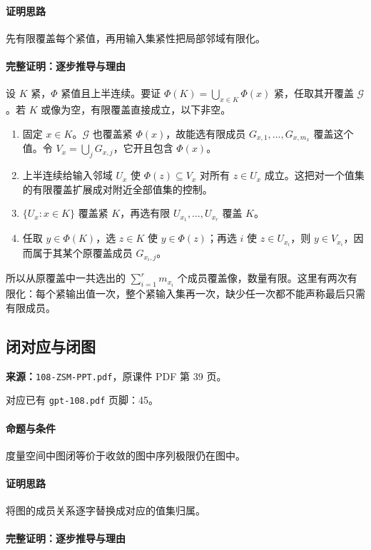 \paragraph{证明思路}先有限覆盖每个紧值，再用输入集紧性把局部邻域有限化。
\paragraph{完整证明：逐步推导与理由}

设 $K$ 紧，$\Phi$ 紧值且上半连续。要证 $\Phi(K)=\bigcup_{x\in K}\Phi(x)$ 紧，任取其开覆盖 $\mathcal G$。若 $K$ 或像为空，有限覆盖直接成立，以下非空。
\begin{enumerate}
\item 固定 $x\in K$。$\mathcal G$ 也覆盖紧 $\Phi(x)$，故能选有限成员 $G_{x,1},\ldots,G_{x,m_x}$ 覆盖这个值。令 $V_x=\bigcup_jG_{x,j}$，它开且包含 $\Phi(x)$。
\item 上半连续给输入邻域 $U_x$ 使 $\Phi(z)\subseteq V_x$ 对所有 $z\in U_x$ 成立。这把对一个值集的有限覆盖扩展成对附近全部值集的控制。
\item $\{U_x:x\in K\}$ 覆盖紧 $K$，再选有限 $U_{x_1},\ldots,U_{x_r}$ 覆盖 $K$。
\item 任取 $y\in\Phi(K)$，选 $z\in K$ 使 $y\in\Phi(z)$；再选 $i$ 使 $z\in U_{x_i}$，则 $y\in V_{x_i}$，因而属于其某个原覆盖成员 $G_{x_i,j}$。
\end{enumerate}
所以从原覆盖中一共选出的 $\sum_{i=1}^r m_{x_i}$ 个成员覆盖像，数量有限。这里有两次有限化：每个紧输出值一次，整个紧输入集再一次，缺少任一次都不能声称最后只需有限成员。

\clearpage\subsection{闭对应与闭图}
\textbf{来源：}\texttt{108-ZSM-PPT.pdf}，原课件 PDF 第 39 页。\par
对应已有 \texttt{gpt-108.pdf} 页脚：45。\par
\paragraph{命题与条件}度量空间中图闭等价于收敛的图中序列极限仍在图中。
\paragraph{证明思路}将图的成员关系逐字替换成对应的值集归属。
\paragraph{完整证明：逐步推导与理由}

